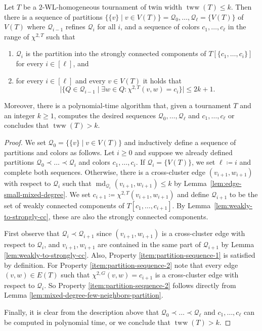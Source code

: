\documentclass{theoretics}
\newcommand{\CQ}{{\mathcal Q}}
\newcommand{\bigmid}{\;\big|\;}
\newcommand{\WL}[2]{\chi^{#1,#2}}
\DeclareMathOperator{\md}{md}
\DeclareMathOperator{\tww}{tww}
\begin{document}
\begin{lemma}
 \label{lem:partition-sequence}
 Let $T$ be a $2$-WL-homogeneous tournament of twin width $\tww(T) \leq k$.
 Then there is a sequence of partitions $\{\{v\} \mid v \in V(T)\} = \CQ_0,\dots,\CQ_\ell = \{V(T)\}$ of $V(T)$ where $\CQ_{i-1}$ refines $\CQ_i$ for all $i$,
 and a sequence of colors $c_1,\dots,c_\ell$ in the range of $\WL{2}{T}$ such that
 \begin{enumerate}
  \item\label{item:partition-sequence-1} $\CQ_i$ is the partition into the strongly connected components of $T[\{c_1,\ldots,c_i\}]$ for every $i \in [\ell]$, and
  \item\label{item:partition-sequence-2} for every $i \in [\ell]$ and every $v \in V(T)$ it holds that
  \[\big|\big\{Q \in \CQ_{i-1} \bigmid \exists w \in Q \colon \WL{2}{T}(v,w) = c_i\big\}\big| \leq 2k+1.\]
 \end{enumerate}
 Moreover, there is a polynomial-time algorithm that, given a tournament $T$ and an integer $k \geq 1$, computes the desired sequences $\CQ_0,\dots,\CQ_\ell$ and $c_1,\dots,c_\ell$ or concludes that $\tww(T) > k$.
\end{lemma}

\begin{proof}
 We set $\CQ_0 = \{\{v\} \mid v \in V(T)\}$ and inductively define a sequence of partitions and colors as follows.
 Let $i \geq 0$ and suppose we already defined partitions $\CQ_0 \prec \dots \prec \CQ_i$ and colors $c_1,\dots,c_i$.
 If $\CQ_i = \{V(T)\}$, we set $\ell \coloneqq i$ and complete both sequences.
 Otherwise, there is a cross-cluster edge $(v_{i+1},w_{i+1})$ with respect to $\CQ_i$ such that $\md_{\CQ_i}(v_{i+1},w_{i+1}) \leq k$ by Lemma~\ref{lem:edge-small-mixed-degree}.
 We set $c_{i+1} \coloneqq \WL{2}{T}(v_{i+1},w_{i+1})$ and define $\CQ_{i+1}$ to be the set of weakly connected components of $T[c_1,\dots,c_{i+1}]$.
 By Lemma~\ref{lem:weakly-to-strongly-cc}, these are also the strongly connected components.

 First observe that $\CQ_i \prec \CQ_{i+1}$ since $(v_{i+1},w_{i+1})$ is a cross-cluster edge with respect to $\CQ_i$, and $v_{i+1},w_{i+1}$ are contained in the same part of $\CQ_{i+1}$ by Lemma \ref{lem:weakly-to-strongly-cc}.
 Also, Property \ref{item:partition-sequence-1} is satisfied by definition.
 For Property \ref{item:partition-sequence-2} note that every edge $(v,w) \in E(T)$ such that $\WL{2}{G}(v,w) = c_{i+1}$ is a cross-cluster edge with respect to $\CQ_i$.
 So Property \ref{item:partition-sequence-2} follows directly from Lemma \ref{lem:mixed-degree-few-neighbors-partition}.

 Finally, it is clear from the description above that $\CQ_0 \prec \dots \prec \CQ_\ell$ and $c_1,\dots,c_\ell$ can be computed in polynomial time, or we conclude that $\tww(T) > k$.
\end{proof}
\end{document}
